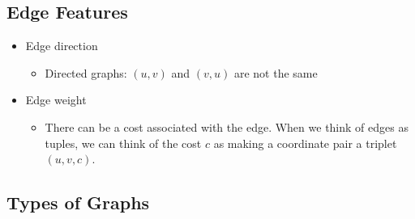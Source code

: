 \documentclass[
  10pt,
  english,
  letterpaper,
,tablecaptionabove
]{scrartcl}
\providecommand{\tightlist}{%
  \setlength{\itemsep}{0pt}\setlength{\parskip}{0pt}}
\begin{document}
\hypertarget{edge-features}{%
\subsection{Edge Features}\label{edge-features}}

\begin{itemize}
\tightlist
\item
  Edge direction

  \begin{itemize}
  \tightlist
  \item
    Directed graphs: \((u,v)\) and \((v,u)\) are not the same
  \end{itemize}
\item
  Edge weight

  \begin{itemize}
  \tightlist
  \item
    There can be a cost associated with the edge. When we think of edges
    as tuples, we can think of the cost \(c\) as making a coordinate
    pair a triplet \((u,v,c)\).
  \end{itemize}
\end{itemize}

\hypertarget{types-of-graphs}{%
\subsection{Types of Graphs}\label{types-of-graphs}}
\end{document}

